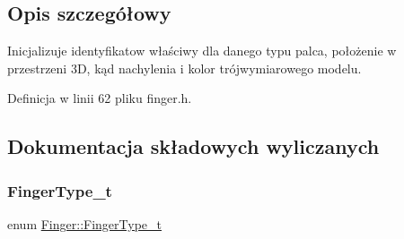 \subsection{Opis szczegółowy}
Inicjalizuje identyfikatow właściwy dla danego typu palca, położenie w przestrzeni 3D, kąd nachylenia i kolor trójwymiarowego modelu. 

Definicja w linii 62 pliku finger.\+h.



\subsection{Dokumentacja składowych wyliczanych}
\mbox{\label{class_finger_a365e6bba2e4877decf3c7641d29838c3}} 
\subsubsection{\texorpdfstring{Finger\+Type\+\_\+t}{FingerType\_t}}
{\footnotesize\ttfamily enum \hyperlink{class_finger_a365e6bba2e4877decf3c7641d29838c3}{Finger\+::\+Finger\+Type\+\_\+t}}


